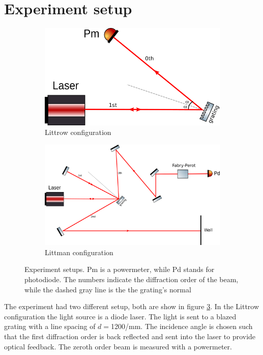 \documentclass[a4paper,10pt]{article}
\begin{document}
\section{Experiment setup}
\begin{figure}[H]
    \centering
    \begin{subfigure}[b]{0.36\textwidth}
        \includegraphics[width=\textwidth]{littrow}
        \caption{Littrow configuration}\label{littrow}
    \end{subfigure}
    \hfill
    \begin{subfigure}[b]{0.62\textwidth}
        \includegraphics[width=\textwidth]{littman}
        \caption{Littman configuration}\label{littman}
    \end{subfigure}
\caption{Experiment setups. Pm is a powermeter, while Pd stands for photodiode. The numbers indicate the diffraction order of the beam, while the dashed gray line is the the grating's normal}\label{setup}
\end{figure}
The experiment had two different setup, both are show in figure \ref{setup}. In the Littrow configuration the light source is a diode laser. The light is sent to a blazed grating with a line spacing of $d=$1200/mm. The incidence angle is chosen such that the first diffraction order is back reflected and sent into the laser to provide optical feedback. The zeroth order beam is measured with a powermeter.\\
\end{document}
